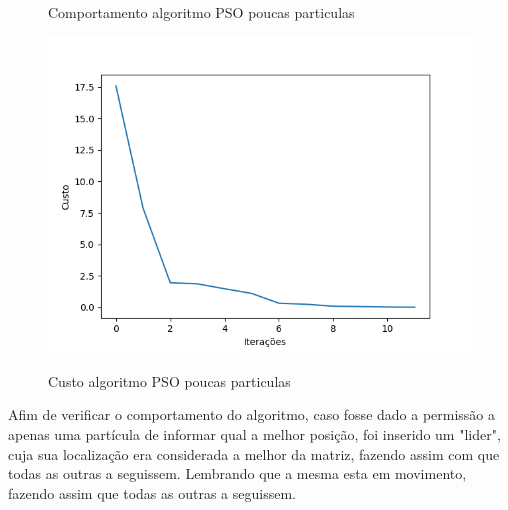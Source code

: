 \documentclass[conference]{IEEEtran}
\begin{document}
\begin{figure}[htbp]
\begin{center}
    \caption{Comportamento algoritmo PSO poucas particulas} \label{gdimotes}
    \includegraphics[scale=0.5]{imagens-pso/particle-swarm-optimization-particles-cost.png}
    \caption{Custo algoritmo PSO poucas particulas} \label{gdimotes}
    \end{center}
    \end{figure}

\vspace*{4cm}
    Afim de verificar o comportamento do algoritmo, caso fosse dado a permissão a apenas uma partícula de informar qual a melhor posição, foi inserido um "lider", cuja sua localização era considerada a melhor da matriz, fazendo assim com que todas as outras a seguissem. Lembrando que a mesma esta em movimento, fazendo assim que todas as outras a seguissem.
\end{document}
